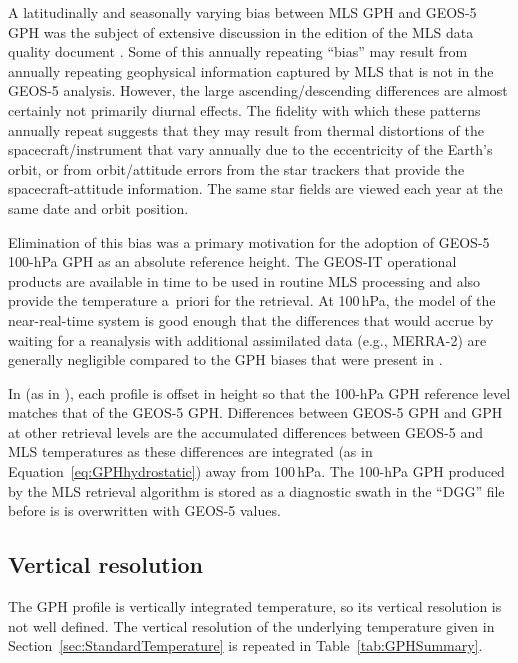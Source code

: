 A latitudinally and seasonally varying bias between MLS \viv GPH and \mbox{GEOS-5} GPH was the subject of extensive discussion in the \viv edition of the MLS data quality document \citep{EOSMLSV4Quality}. Some of this annually repeating ``bias'' may result from annually repeating geophysical information captured by MLS that is not in the \mbox{GEOS-5} analysis. However, the large ascending/descending differences are almost certainly not primarily diurnal effects. The fidelity with which these patterns annually repeat suggests that they may result from thermal distortions of the spacecraft/instrument that vary annually due to the eccentricity of the Earth's orbit, or from orbit/attitude errors from the star trackers that provide the spacecraft-attitude information. The same star fields are viewed each year at the same date and orbit position.

Elimination of this bias was a primary motivation for the adoption of \mbox{GEOS-5} \mbox{100-hPa} GPH as an absolute reference height. The \mbox{GEOS-IT} operational products are available in time to be used in routine \thisv MLS processing and also provide the temperature a~priori for the retrieval. At 100\,hPa, the model of the near-real-time system is good enough that the differences that would accrue by waiting for a reanalysis with additional assimilated data (e.g., \mbox{MERRA-2}) are generally negligible compared to the GPH biases that were present in \viv.

In \thisv (as in \prevv), each profile is offset in height so that the \mbox{100-hPa} GPH reference level matches that of the \mbox{GEOS-5} GPH\@. Differences between \mbox{GEOS-5} GPH and \thisv GPH at other retrieval levels are the accumulated differences between \mbox{GEOS-5} and MLS temperatures as these differences are integrated (as in Equation~\ref{eq:GPHhydrostatic}) away from 100\,hPa. The \mbox{100-hPa} GPH produced by the MLS \thisv retrieval algorithm is stored as a diagnostic swath in the ``DGG'' file before is is overwritten with \mbox{GEOS-5} values.

\subsection{Vertical resolution}

The GPH profile is vertically integrated temperature, so its vertical resolution is not well defined. The vertical resolution of the underlying temperature given in Section~\ref{sec:StandardTemperature} is repeated in Table~\ref{tab:GPHSummary}.

